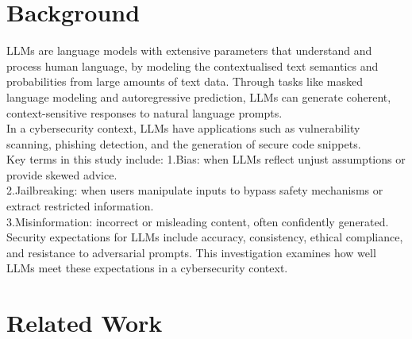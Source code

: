 \documentclass[sigconf]{acmart}
\begin{document}
\section{Background}
LLMs are language models with extensive parameters that understand and process human language, by modeling the contextualised text semantics and probabilities from large amounts of text data.\cite{Yao23} Through tasks like masked language modeling and autoregressive prediction, LLMs can generate coherent, context-sensitive responses to natural language prompts.\cite{Yao23}
\\
In a cybersecurity context, LLMs have applications such as vulnerability scanning, phishing detection, and the generation of secure code snippets.\cite{Yao23}
\\
Key terms in this study include:
1.Bias: when LLMs reflect unjust assumptions or provide skewed advice.
\\
2.Jailbreaking: when users manipulate inputs to bypass safety mechanisms or extract restricted information.
\\
3.Misinformation: incorrect or misleading content, often confidently generated.
\\
Security expectations for LLMs include accuracy, consistency, ethical compliance, and resistance to adversarial prompts. This investigation examines how well LLMs meet these expectations in a cybersecurity context.










\section{Related Work}
\end{document}
